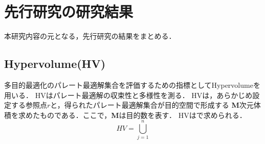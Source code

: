 \documentclass[main]{subfiles}
\begin{document}
    \chapter{先行研究の研究結果}
    本研究内容の元となる，先行研究の結果をまとめる\cite{senkoukenkyu}．

    \section{Hypervolume(HV)}
    多目的最適化のパレート最適解集合を評価するための指標としてHypervolumeを用いる\cite{hv}．
    HVはパレート最適解の収束性と多様性を測る．
    HVは，あらかじめ設定する参照点\boldmath$r$と，得られたパレート最適解集合が目的空間で形成する
    \textbf{M}次元体積を求めたものである．ここで，\textbf{M}は目的数を表す．
    HVは\label{hv_siki}で求められる．
    \begin{equation}
        HV = \bigcup_{j=1}^n
        \label{hv_siki}
    \end{equation}
\end{document}
